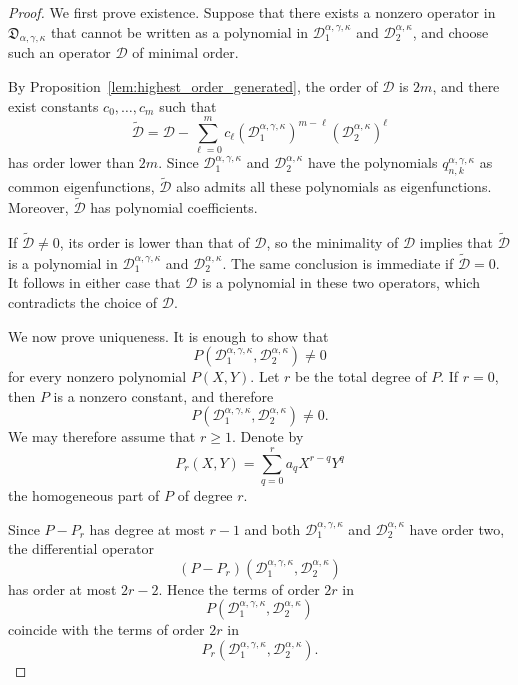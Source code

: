 \documentclass[reqno,10pt]{amsart}
\theoremstyle{plain}
\numberwithin{equation}{section}
\numberwithin{figure}{section}
\begin{document}
\begin{proof}
We first prove existence. Suppose that there exists a nonzero operator in
\(\mathfrak D_{\alpha,\gamma,\kappa}\) that cannot be written as a
polynomial in \(\mathcal D_1^{\alpha,\gamma,\kappa}\) and
\(\mathcal D_2^{\alpha,\kappa}\), and choose such an operator
\(\mathcal D\) of minimal order.

By Proposition~\ref{lem:highest_order_generated}, the order of
\(\mathcal D\) is \(2m\), and there exist constants
\(c_0,\ldots,c_m\) such that
\[
\widetilde{\mathcal D}
=
\mathcal D
-
\sum_{\ell=0}^{m}
c_\ell
\left(\mathcal D_1^{\alpha,\gamma,\kappa}\right)^{m-\ell}
\left(\mathcal D_2^{\alpha,\kappa}\right)^\ell
\]
has order lower than \(2m\). Since
\(\mathcal D_1^{\alpha,\gamma,\kappa}\) and
\(\mathcal D_2^{\alpha,\kappa}\) have the polynomials
\(q_{n,k}^{\alpha,\gamma,\kappa}\) as common eigenfunctions,
\(\widetilde{\mathcal D}\) also admits all these polynomials as
eigenfunctions. Moreover, \(\widetilde{\mathcal D}\) has polynomial
coefficients.

If \(\widetilde{\mathcal D}\neq0\), its order is lower than that of
\(\mathcal D\), so the minimality of \(\mathcal D\) implies that
\(\widetilde{\mathcal D}\) is a polynomial in
\(\mathcal D_1^{\alpha,\gamma,\kappa}\) and
\(\mathcal D_2^{\alpha,\kappa}\). The same conclusion is immediate if
\(\widetilde{\mathcal D}=0\). It follows in either case that
\(\mathcal D\) is a polynomial in these two operators, which contradicts
the choice of \(\mathcal D\).

We now prove uniqueness. It is enough to show that
\[
P\left(
\mathcal D_1^{\alpha,\gamma,\kappa},
\mathcal D_2^{\alpha,\kappa}
\right)
\neq0
\]
for every nonzero polynomial \(P(X,Y)\). Let \(r\) be the total degree of \(P\). If \(r=0\), then \(P\) is a
nonzero constant, and therefore
\[
P\left(
\mathcal D_1^{\alpha,\gamma,\kappa},
\mathcal D_2^{\alpha,\kappa}
\right)
\neq0.
\]
We may therefore assume that \(r\geq1\). Denote by
\[
P_r(X,Y)
=
\sum_{q=0}^{r}a_qX^{r-q}Y^q
\]
the homogeneous part of \(P\) of degree \(r\). 

Since \(P-P_r\) has degree at most \(r-1\) and both
\(\mathcal D_1^{\alpha,\gamma,\kappa}\) and
\(\mathcal D_2^{\alpha,\kappa}\) have order two, the differential
operator
\[
(P-P_r)\left(
\mathcal D_1^{\alpha,\gamma,\kappa},
\mathcal D_2^{\alpha,\kappa}
\right)
\]
has order at most \(2r-2\). Hence the terms of order \(2r\) in
\[
P\left(
\mathcal D_1^{\alpha,\gamma,\kappa},
\mathcal D_2^{\alpha,\kappa}
\right)
\]
coincide with the terms of order \(2r\) in
\[
P_r\left(
\mathcal D_1^{\alpha,\gamma,\kappa},
\mathcal D_2^{\alpha,\kappa}
\right).
\]


\end{proof}
\end{document}
